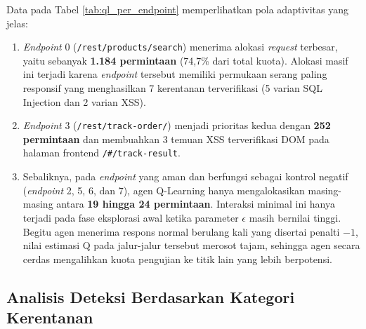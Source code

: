 Data pada Tabel \ref{tab:ql_per_endpoint} memperlihatkan pola adaptivitas yang jelas:
\begin{enumerate}
    \item \textit{Endpoint} 0 (\texttt{/rest/products/search}) menerima alokasi \textit{request} terbesar, yaitu sebanyak \textbf{1.184 permintaan} (74,7\% dari total kuota). Alokasi masif ini terjadi karena \textit{endpoint} tersebut memiliki permukaan serang paling responsif yang menghasilkan 7 kerentanan terverifikasi (5 varian SQL Injection dan 2 varian XSS). 
    \item \textit{Endpoint} 3 (\texttt{/rest/track-order/}) menjadi prioritas kedua dengan \textbf{252 permintaan} dan membuahkan 3 temuan XSS terverifikasi DOM pada halaman frontend \texttt{/\#/track-result}. 
    \item Sebaliknya, pada \textit{endpoint} yang aman dan berfungsi sebagai kontrol negatif (\textit{endpoint} 2, 5, 6, dan 7), agen Q-Learning hanya mengalokasikan masing-masing antara \textbf{19 hingga 24 permintaan}. Interaksi minimal ini hanya terjadi pada fase eksplorasi awal ketika parameter $\epsilon$ masih bernilai tinggi. Begitu agen menerima respons normal berulang kali yang disertai penalti $-1$, nilai estimasi Q pada jalur-jalur tersebut merosot tajam, sehingga agen secara cerdas mengalihkan kuota pengujian ke titik lain yang lebih berpotensi. 
\end{enumerate}

\subsection{Analisis Deteksi Berdasarkan Kategori Kerentanan}

